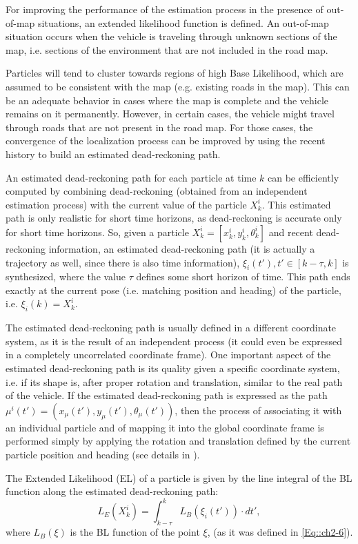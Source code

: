 For improving the performance of the estimation process in the presence of out-of-map situations, an extended likelihood function is defined. An out-of-map situation occurs when the vehicle is traveling through unknown sections of the map, i.e. sections of the environment that are not included in the road map. 

Particles will tend to cluster towards regions of high Base Likelihood, which are assumed to be consistent with the map (e.g. existing roads in the map). This can be an adequate behavior in cases where the map is complete and the vehicle remains on it permanently. However, in certain cases, the vehicle might travel through roads that are not present in the road map. For those cases, the convergence of the localization process can be improved by using the recent history to build an estimated dead-reckoning path.

An estimated dead-reckoning path for each particle at time $k$ can be efficiently computed by combining dead-reckoning (obtained from an independent estimation process) with the current value of the particle $X_k^i$. This estimated path is only realistic for short time horizons, as dead-reckoning is accurate only for short time horizons. So, given a particle $X_k^i=[x_k^i,y_k^i,\theta_k^i]$ and recent dead-reckoning information, an estimated dead-reckoning path (it is actually a trajectory as well, since there is also time information), $\xi_i (t'), t' \in [k-\tau,k] $ is synthesized, where the value $\tau$ defines some short horizon of time. This path ends exactly at the current pose (i.e. matching position and heading) of the particle, i.e. $\xi_i(k)=X_k^i$.

The estimated dead-reckoning path is usually defined in a different coordinate system, as it is the result of an independent process (it could even be expressed in a completely uncorrelated coordinate frame). One important aspect of the estimated dead-reckoning path is its quality given a specific coordinate system, i.e. if its shape is, after proper rotation and translation, similar to the real path of the vehicle. If the estimated dead-reckoning path is expressed as the path $\mu^i (t' )=(x_{\mu}(t'),y_{\mu}(t'),\theta_{\mu}(t'))$, then the process of associating it with an individual particle and of mapping it into the global coordinate frame is performed simply by applying the rotation and translation defined by the current particle position and heading (see details in \cite{guivant2010robust}).

The Extended Likelihood (EL) of a particle is given by the line integral of the BL function along the estimated dead-reckoning path:
\begin{equation}
\label{Eq::ch2-7}
L_E (X_k^i )=\int_{k-\tau}^{k} L_B(\xi_i(t')) \cdotp dt',
\end{equation}
where $L_B (\xi)$ is the BL function of the point $\xi$, (as it was defined in \ref{Eq::ch2-6}).

